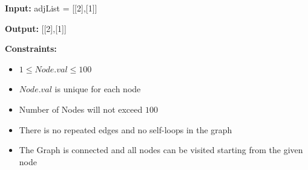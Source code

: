\documentclass[a4paper]{article}
\begin{document}
\textbf{Input:} adjList = [[2],[1]]

\textbf{Output:} [[2],[1]]


\SPACE

\textbf{Constraints:}

\begin{itemize}
\item $1 \le Node.val \le 100$
\item $Node.val$ is unique for each node
\item Number of Nodes will not exceed $100$
\item There is no repeated edges and no self-loops in the graph
\item The Graph is connected and all nodes can be visited starting from the given node
\end{itemize}
\end{document}
